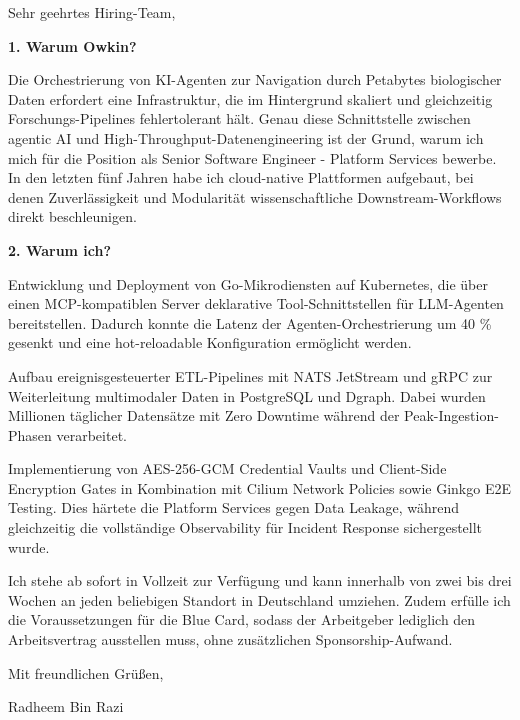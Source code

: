 \documentclass[11pt,a4paper]{coverletter}
\begin{document}
\opening{Sehr geehrtes Hiring-Team,}

\vspace{8pt}\noindent\textbf{1. Warum Owkin?}\par\vspace{3pt}

Die Orchestrierung von KI-Agenten zur Navigation durch Petabytes biologischer Daten erfordert eine Infrastruktur, die im Hintergrund skaliert und gleichzeitig Forschungs-Pipelines fehlertolerant hält. Genau diese Schnittstelle zwischen agentic AI und High-Throughput-Datenengineering ist der Grund, warum ich mich für die Position als Senior Software Engineer - Platform Services bewerbe. In den letzten fünf Jahren habe ich cloud-native Plattformen aufgebaut, bei denen Zuverlässigkeit und Modularität wissenschaftliche Downstream-Workflows direkt beschleunigen.

\vspace{8pt}\noindent\textbf{2. Warum ich?}\par\vspace{3pt}

\bullets

  \item Entwicklung und Deployment von Go-Mikrodiensten auf Kubernetes, die über einen MCP-kompatiblen Server deklarative Tool-Schnittstellen für LLM-Agenten bereitstellen. Dadurch konnte die Latenz der Agenten-Orchestrierung um 40 \% gesenkt und eine hot-reloadable Konfiguration ermöglicht werden.

  \item Aufbau ereignisgesteuerter ETL-Pipelines mit NATS JetStream und gRPC zur Weiterleitung multimodaler Daten in PostgreSQL und Dgraph. Dabei wurden Millionen täglicher Datensätze mit Zero Downtime während der Peak-Ingestion-Phasen verarbeitet.

  \item Implementierung von AES-256-GCM Credential Vaults und Client-Side Encryption Gates in Kombination mit Cilium Network Policies sowie Ginkgo E2E Testing. Dies härtete die Platform Services gegen Data Leakage, während gleichzeitig die vollständige Observability für Incident Response sichergestellt wurde.

\bulletsend

Ich stehe ab sofort in Vollzeit zur Verfügung und kann innerhalb von zwei bis drei Wochen an jeden beliebigen Standort in Deutschland umziehen. Zudem erfülle ich die Voraussetzungen für die Blue Card, sodass der Arbeitgeber lediglich den Arbeitsvertrag ausstellen muss, ohne zusätzlichen Sponsorship-Aufwand.

\closing{Mit freundlichen Grüßen,}{Radheem Bin Razi}
\end{document}
